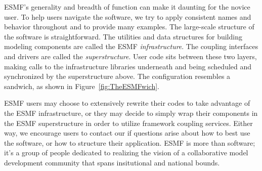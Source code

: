 ESMF's generality and breadth of function can make it daunting for the
novice user.  To help users navigate the software, we try to apply
consistent names and behavior throughout and to provide many examples.
The large-scale structure of the software is straightforward.
The utilities and data structures for building modeling components 
are called the ESMF {\it infrastructure}.  The coupling interfaces and
drivers are called the {\it superstructure}.  User code sits between
these two layers, making calls to the infrastructure
libraries underneath and being scheduled and synchronized by the 
superstructure above.  The configuration resembles a sandwich, as
shown in Figure~\ref{fig:TheESMFwich}.

ESMF users may choose to extensively rewrite their codes
to take advantage of the ESMF infrastructure, or they may decide to
simply wrap their components in the ESMF superstructure in order to
utilize framework coupling services.  Either way, we encourage users
to contact our 
 if questions arise about how to best
use the software, or how to structure their application.  ESMF is
more than software;  it's a group of people dedicated to realizing
the vision of a collaborative model development community that spans
insitutional and national bounds.

